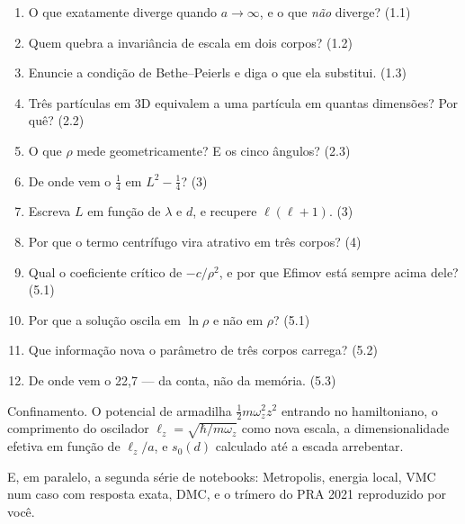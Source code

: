 \documentclass[11pt,a4paper]{article}
\begin{document}
\begin{enumerate}[leftmargin=*, itemsep=3pt]
\item O que exatamente diverge quando $a\to\infty$, e o que \emph{não} diverge? \hfill (1.1)
\item Quem quebra a invariância de escala em dois corpos? \hfill (1.2)
\item Enuncie a condição de Bethe--Peierls e diga o que ela substitui. \hfill (1.3)
\item Três partículas em 3D equivalem a uma partícula em quantas dimensões? Por quê? \hfill (2.2)
\item O que $\rho$ mede geometricamente? E os cinco ângulos? \hfill (2.3)
\item De onde vem o $\tfrac14$ em $L^{2}-\tfrac14$? \hfill (3)
\item Escreva $L$ em função de $\lambda$ e $d$, e recupere $\ell(\ell+1)$. \hfill (3)
\item Por que o termo centrífugo vira atrativo em três corpos? \hfill (4)
\item Qual o coeficiente crítico de $-c/\rho^{2}$, e por que Efimov está sempre acima dele? \hfill (5.1)
\item Por que a solução oscila em $\ln\rho$ e não em $\rho$? \hfill (5.1)
\item Que informação nova o parâmetro de três corpos carrega? \hfill (5.2)
\item De onde vem o 22,7 --- da conta, não da memória. \hfill (5.3)
\end{enumerate}

\vspace{0.6cm}
\begin{ponte}
Confinamento. O potencial de armadilha $\tfrac12 m\omega_{z}^{2}z^{2}$ entrando no
hamiltoniano, o comprimento do oscilador $\ell_{z}=\sqrt{\hbar/m\omega_{z}}$ como
nova escala, a dimensionalidade efetiva em função de $\ell_{z}/a$, e $s_{0}(d)$
calculado até a escada arrebentar.

E, em paralelo, a segunda série de notebooks: Metropolis, energia local, VMC num caso
com resposta exata, DMC, e o trímero do PRA 2021 reproduzido por você.
\end{ponte}
\end{document}
